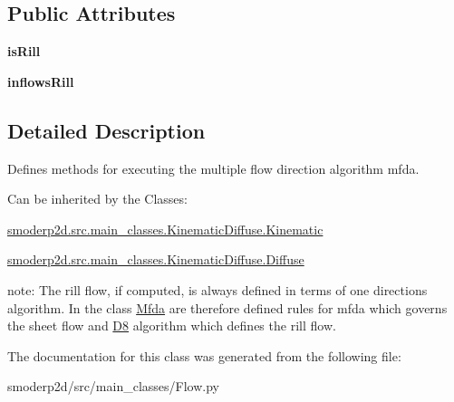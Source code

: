 \subsection*{Public Attributes}
\begin{DoxyCompactItemize}
\item 
\hypertarget{classsmoderp2d_1_1src_1_1main__classes_1_1Flow_1_1Mfda_ac4d6e378b98d5e570bccbcb1b67c7eb8}{{\bfseries is\-Rill}}\label{classsmoderp2d_1_1src_1_1main__classes_1_1Flow_1_1Mfda_ac4d6e378b98d5e570bccbcb1b67c7eb8}

\item 
\hypertarget{classsmoderp2d_1_1src_1_1main__classes_1_1Flow_1_1Mfda_aa001d3d609b92113c5291a6935a3fc54}{{\bfseries inflows\-Rill}}\label{classsmoderp2d_1_1src_1_1main__classes_1_1Flow_1_1Mfda_aa001d3d609b92113c5291a6935a3fc54}

\end{DoxyCompactItemize}


\subsection{Detailed Description}
Defines methods for executing the multiple flow direction algorithm mfda. 

Can be inherited by the Classes\-:


\begin{DoxyItemize}
\item \hyperlink{classsmoderp2d_1_1src_1_1main__classes_1_1KinematicDiffuse_1_1Kinematic}{smoderp2d.\-src.\-main\-\_\-classes.\-Kinematic\-Diffuse.\-Kinematic}
\item \hyperlink{classsmoderp2d_1_1src_1_1main__classes_1_1KinematicDiffuse_1_1Diffuse}{smoderp2d.\-src.\-main\-\_\-classes.\-Kinematic\-Diffuse.\-Diffuse}
\end{DoxyItemize}

note\-: The rill flow, if computed, is always defined in terms of one directions algorithm. In the class \hyperlink{classsmoderp2d_1_1src_1_1main__classes_1_1Flow_1_1Mfda}{Mfda} are therefore defined rules for mfda which governs the sheet flow and \hyperlink{classsmoderp2d_1_1src_1_1main__classes_1_1Flow_1_1D8}{D8} algorithm which defines the rill flow. 

The documentation for this class was generated from the following file\-:\begin{DoxyCompactItemize}
\item 
smoderp2d/src/main\-\_\-classes/Flow.\-py\end{DoxyCompactItemize}
